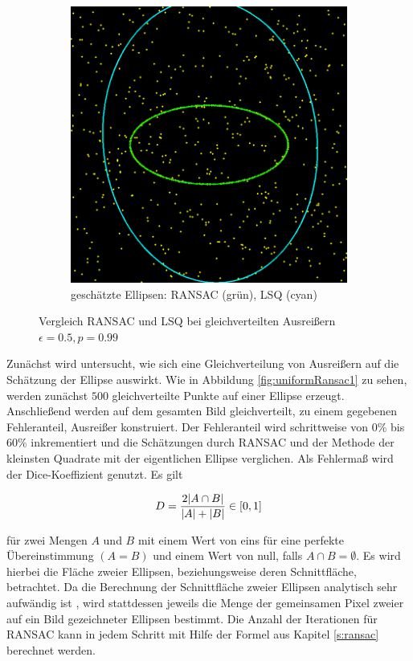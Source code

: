 {\begin{figure}[!htb]
\begin{subfigure}{.5\textwidth}
		\includegraphics[width=.9\textwidth]{images/ransac50_1.png}
		\caption{geschätzte Ellipsen: RANSAC (grün), LSQ (cyan)}
		\label{fig:uniformRansac2}
	\end{subfigure}
	\label{fig:uniformRansac}
	\caption{Vergleich RANSAC und LSQ bei gleichverteilten Ausreißern $\epsilon = 0.5, p = 0.99$}
\end{figure}

Zunächst wird untersucht, wie sich eine Gleichverteilung von Ausreißern auf die Schätzung der Ellipse auswirkt. Wie in Abbildung \ref{fig:uniformRansac1} zu sehen, werden zunächst $500$ gleichverteilte Punkte auf einer Ellipse erzeugt. 
Anschließend werden auf dem gesamten Bild gleichverteilt, zu einem gegebenen Fehleranteil, Ausreißer konstruiert. Der Fehleranteil wird schrittweise von 0\% bis 60\% inkrementiert und die Schätzungen durch RANSAC und der Methode der kleinsten Quadrate mit der eigentlichen Ellipse verglichen. Als Fehlermaß wird der Dice-Koeffizient \cite{Dice1945} genutzt. Es gilt

\[
	D = \frac{2\lvert A\cap B\rvert}{\lvert A\rvert + \lvert B\rvert} \in [0, 1]
\]

für zwei Mengen $A$ und $B$ mit einem Wert von eins für eine perfekte Übereinstimmung $(A = B)$ und einem Wert von null, falls $A\cap B = \emptyset$. Es wird hierbei die Fläche zweier Ellipsen, beziehungsweise deren Schnittfläche, betrachtet. Da die Berechnung der Schnittfläche zweier Ellipsen analytisch sehr aufwändig ist \cite{Eberly2008}, wird stattdessen jeweils die Menge der gemeinsamen Pixel zweier auf ein Bild gezeichneter Ellipsen bestimmt.
Die Anzahl der Iterationen für RANSAC kann in jedem Schritt mit Hilfe der Formel aus Kapitel \ref{s:ransac} berechnet werden.

}
